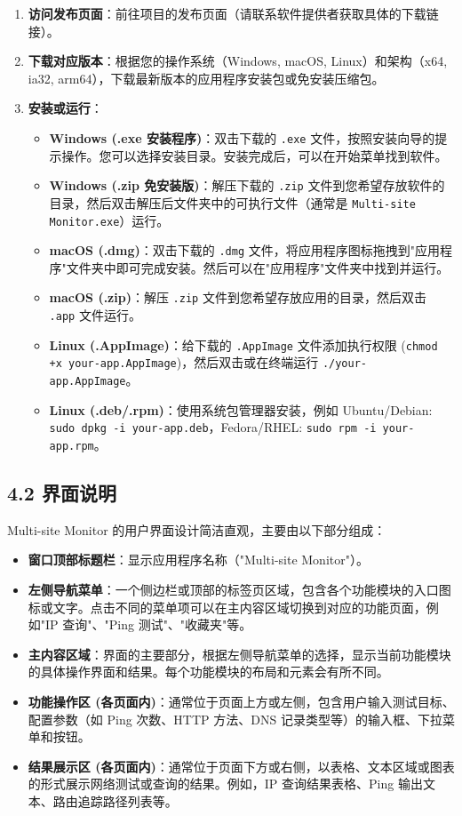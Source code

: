 \documentclass{article}
\begin{document}
\begin{enumerate}[label=\arabic*.]
    \item \textbf{访问发布页面}：前往项目的发布页面（请联系软件提供者获取具体的下载链接）。
    \item \textbf{下载对应版本}：根据您的操作系统（Windows, macOS, Linux）和架构（x64, ia32, arm64），下载最新版本的应用程序安装包或免安装压缩包。
    \item \textbf{安装或运行}：
    \begin{itemize}
        \item \textbf{Windows (.exe 安装程序)}：双击下载的 \texttt{.exe} 文件，按照安装向导的提示操作。您可以选择安装目录。安装完成后，可以在开始菜单找到软件。
        \item \textbf{Windows (.zip 免安装版)}：解压下载的 \texttt{.zip} 文件到您希望存放软件的目录，然后双击解压后文件夹中的可执行文件（通常是 \texttt{Multi-site Monitor.exe}）运行。
        \item \textbf{macOS (.dmg)}：双击下载的 \texttt{.dmg} 文件，将应用程序图标拖拽到"应用程序"文件夹中即可完成安装。然后可以在"应用程序"文件夹中找到并运行。
        \item \textbf{macOS (.zip)}：解压 \texttt{.zip} 文件到您希望存放应用的目录，然后双击 \texttt{.app} 文件运行。
        \item \textbf{Linux (.AppImage)}：给下载的 \texttt{.AppImage} 文件添加执行权限 (\texttt{chmod +x your-app.AppImage})，然后双击或在终端运行 \texttt{./your-app.AppImage}。
        \item \textbf{Linux (.deb/.rpm)}：使用系统包管理器安装，例如 Ubuntu/Debian: \texttt{sudo dpkg -i your-app.deb}，Fedora/RHEL: \texttt{sudo rpm -i your-app.rpm}。
    \end{itemize}
\end{enumerate}

\subsection*{4.2 界面说明}

Multi-site Monitor 的用户界面设计简洁直观，主要由以下部分组成：

\begin{itemize}
    \item \textbf{窗口顶部标题栏}：显示应用程序名称（"Multi-site Monitor"）。
    \item \textbf{左侧导航菜单}：一个侧边栏或顶部的标签页区域，包含各个功能模块的入口图标或文字。点击不同的菜单项可以在主内容区域切换到对应的功能页面，例如"IP 查询"、"Ping 测试"、"收藏夹"等。
    \item \textbf{主内容区域}：界面的主要部分，根据左侧导航菜单的选择，显示当前功能模块的具体操作界面和结果。每个功能模块的布局和元素会有所不同。
    \item \textbf{功能操作区 (各页面内)}：通常位于页面上方或左侧，包含用户输入测试目标、配置参数（如 Ping 次数、HTTP 方法、DNS 记录类型等）的输入框、下拉菜单和按钮。
    \item \textbf{结果展示区 (各页面内)}：通常位于页面下方或右侧，以表格、文本区域或图表的形式展示网络测试或查询的结果。例如，IP 查询结果表格、Ping 输出文本、路由追踪路径列表等。
\end{itemize}
\end{document}
